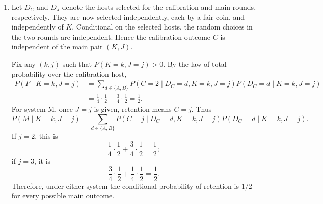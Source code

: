 \documentclass[11pt,a4paper]{article}
\newcommand{\Prob}{P}
\begin{document}
\begin{enumerate}
\textbf{System M.} Here retention means $C=J$. For $J=2$, part (a)
again gives $\Prob(M,J=2)=23/96$ and the posterior $15/23$.
For $J=3$, retention requires $C=3$. Conditioning on the host,
\begin{align*}
\Prob(K=1,C=3,J=3)
&=\sum_{d\in\{A,B\}}\Prob(D=d)\Prob(K=1)(1-q_d)^2\\
&=\frac12\cdot\frac12\left[\left(\frac34\right)^2
  +\left(\frac14\right)^2\right]
=\frac5{32},\\
\Prob(K=2,C=3,J=3)
&=\frac12\cdot\frac13\left(\frac34+\frac14\right)=\frac16.
\end{align*}
Therefore,
\[
\Prob(M,J=3)=\frac5{32}+\frac16=\frac{31}{96},\qquad
\Prob(M)=\frac{23}{96}+\frac{31}{96}=\frac9{16}.
\]
It follows that
\[
\Prob(J=2\mid M)=\frac{23/96}{9/16}=\frac{23}{54},\qquad
\Prob(J=3\mid M)=\frac{31/96}{9/16}=\frac{31}{54},
\]
and
\[
\Prob(K=1\mid J=3,M)=\frac{5/32}{31/96}=\frac{15}{31}.
\]
The requested table for system M is
\begin{center}
\begin{tabular}{ccc}
\toprule
$j$ & $\Prob(J=j\mid M)$ & $\Prob(K=1\mid J=j,M)$\\\midrule
$2$ & $23/54$ & $15/23$\\
$3$ & $31/54$ & $15/31$\\\bottomrule
\end{tabular}
\end{center}
Applying the conditional law of total probability again,
\[
\Prob(K=1\mid M)
=\sum_{j=2,3}\Prob(K=1\mid J=j,M)\Prob(J=j\mid M)
=\frac{15}{23}\cdot\frac{23}{54}+\frac{15}{31}\cdot\frac{31}{54}
=\boxed{\frac59}.
\]
The equality in part (a) applies only to the row $J=2$. When $J=3$,
system F conditions on $C=2$, while system M conditions on $C=3$, giving
different posterior probabilities. The two systems also assign different
conditional probabilities to $J=2$ and $J=3$. Thus their weighted averages
need not be equal, and here $\Prob(K=1\mid F)=1/2\ne5/9=\Prob(K=1\mid M)$.

\item Let $D_C$ and $D_J$ denote the hosts selected for the calibration
and main rounds, respectively. They are now selected independently, each
by a fair coin, and independently of $K$. Conditional on the selected
hosts, the random choices in the two rounds are independent. Hence the
calibration outcome $C$ is independent of the main pair $(K,J)$.

Fix any $(k,j)$ such that $\Prob(K=k,J=j)>0$. By the law of total
probability over the calibration host,
\begin{align*}
\Prob(F\mid K=k,J=j)
&=\sum_{d\in\{A,B\}}
\Prob(C=2\mid D_C=d,K=k,J=j)\Prob(D_C=d\mid K=k,J=j)\\
&=\frac14\cdot\frac12+\frac34\cdot\frac12
=\frac12.
\end{align*}
For system M, once $J=j$ is given, retention means $C=j$. Thus
\[
\Prob(M\mid K=k,J=j)
=\sum_{d\in\{A,B\}}
\Prob(C=j\mid D_C=d,K=k,J=j)\Prob(D_C=d\mid K=k,J=j).
\]
If $j=2$, this is
\[
\frac14\cdot\frac12+\frac34\cdot\frac12=\frac12;
\]
if $j=3$, it is
\[
\frac34\cdot\frac12+\frac14\cdot\frac12=\frac12.
\]
Therefore, under either system the conditional probability of retention
is $1/2$ for every possible main outcome.


\end{enumerate}
\end{document}
